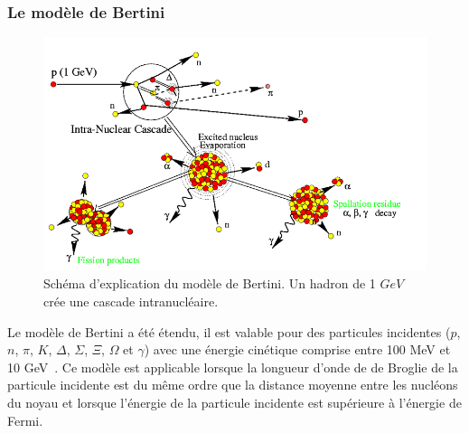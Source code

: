 \subsubsection{Le modèle de Bertini}
\begin{figure}[!ht]
  \begin{center}
    \includegraphics[width=.8\textwidth]{Digitizer/figs/intraNucl.png}
    \caption{Schéma d'explication du modèle de Bertini. Un hadron de 1 $GeV$ crée une cascade intranucléaire.}
    \label{fig.g4bertini}
  \end{center}
\end{figure}
Le modèle de Bertini a été étendu, il est valable pour des particules incidentes ($p$, $n$, $\pi$, $K$, $\Delta$, $\Sigma$, $\Xi$, $\Omega$ et $\gamma$) avec une énergie cinétique comprise entre 100 MeV et 10 GeV~\cite{geant4_bertini}. Ce modèle est applicable lorsque la longueur d'onde de de Broglie de la particule incidente est du même ordre que la distance moyenne entre les nucléons du noyau et lorsque l'énergie de la particule incidente est supérieure à l'énergie de Fermi. 

